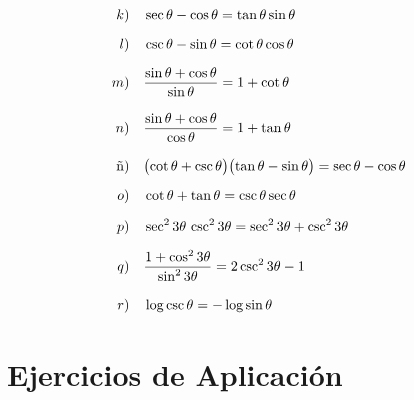 \documentclass[12pt,a4paper]{article}
\begin{document}
\vspace{4pt}

\begin{tcolorbox}[ejercbox, title={\color{dorado}\bfseries Identidades adicionales (65--73)}]
\begin{align*}
k)\quad &\sec\theta - \cos\theta = \tan\theta\sin\theta \\[6pt]
l)\quad &\csc\theta - \sin\theta = \cot\theta\cos\theta \\[6pt]
m)\quad &\frac{\sin\theta + \cos\theta}{\sin\theta} = 1 + \cot\theta \\[8pt]
n)\quad &\frac{\sin\theta + \cos\theta}{\cos\theta} = 1 + \tan\theta \\[8pt]
\~{n})\quad &\bigl(\cot\theta + \csc\theta\bigr)\bigl(\tan\theta - \sin\theta\bigr)
          = \sec\theta - \cos\theta \\[6pt]
o)\quad &\cot\theta + \tan\theta = \csc\theta\sec\theta \\[6pt]
p)\quad &\sec^2 3\theta\,\csc^2 3\theta = \sec^2 3\theta + \csc^2 3\theta \\[6pt]
q)\quad &\frac{1 + \cos^2 3\theta}{\sin^2 3\theta} = 2\csc^2 3\theta - 1 \\[8pt]
r)\quad &\log\csc\theta = -\log\sin\theta
\end{align*}
\end{tcolorbox}

\newpage

\section{Ejercicios de Aplicación}
\end{document}
